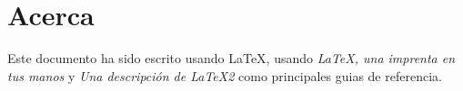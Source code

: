 
\chapter{Acerca}

Este documento ha sido escrito usando \LaTeX, usando 
\emph{\LaTeX, una imprenta en tus manos}\cite{LaTeXimprenta} y
\emph{Una descripción de \LaTeX 2}\cite{LaTeXdescripcion}
como principales guias de referencia.
